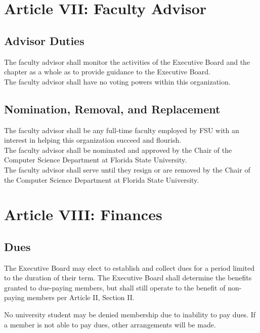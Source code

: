 \documentclass{article}
\begin{document}
\section{Article VII: Faculty Advisor}

\subsection{Advisor Duties}

The faculty advisor shall monitor the activities of the Executive Board
and the chapter as a whole as to provide guidance to the Executive
Board.\\

The faculty advisor shall have no voting powers within this
organization.

\subsection{Nomination, Removal, and Replacement}

The faculty advisor shall be any full-time faculty employed by FSU with
an interest in helping this organization succeed and flourish.\\

The faculty advisor shall be nominated and approved by the Chair of the
Computer Science Department at Florida State University.\\

The faculty advisor shall serve until they resign or are removed by the
Chair of the Computer Science Department at Florida State University.

\section{Article VIII: Finances}

\subsection{Dues}

The Executive Board may elect to establish and collect dues for a period
limited to the duration of their term. The Executive Board shall
determine the benefits granted to due-paying members, but shall still
operate to the benefit of non-paying members per Article II, Section II.

No university student may be denied membership due to inability to pay
dues. If a member is not able to pay dues, other arrangements will be
made.
\end{document}

